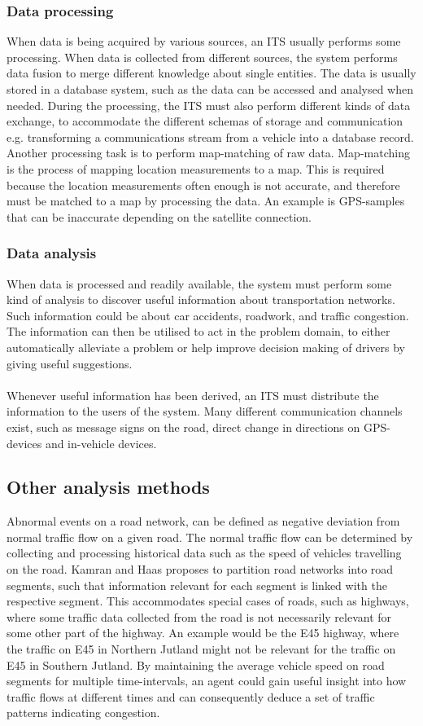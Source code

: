\subsubsection*{Data processing}
When data is being acquired by various sources, an ITS usually performs some processing. When data is collected from different sources, the system performs data fusion to merge different knowledge about single entities. The data is usually stored in a database system, such as the data can be accessed and analysed when needed. During the processing, the ITS must also perform different kinds of data exchange, to accommodate the different schemas of storage and communication e.g. transforming a communications stream from a vehicle into a database record.\\
Another processing task is to perform map-matching of raw data. Map-matching is the process of mapping location measurements to a map. This is required because the location measurements often enough is not accurate, and therefore must be matched to a map by processing the data. An example is GPS-samples that can be inaccurate depending on the satellite connection.

\subsubsection*{Data analysis}
When data is processed and readily available, the system must perform some kind of analysis to discover useful information about transportation networks. Such information could be about car accidents, roadwork, and traffic congestion. The information can then be utilised to act in the problem domain, to either automatically alleviate a problem or help improve decision making of drivers by giving useful suggestions.
\\\\
Whenever useful information has been derived, an ITS must distribute the information to the users of the system. Many different communication channels exist, such as message signs on the road, direct change in directions on GPS-devices and in-vehicle devices.

\subsection{Other analysis methods}
Abnormal events on a road network, can be defined as negative deviation from normal traffic flow on a given road. The normal traffic flow can be determined by collecting and processing historical data such as the speed of vehicles travelling on the road. Kamran and Haas\cite{KamranHaas2007} proposes to partition road networks into road segments, such that information relevant for each segment is linked with the respective segment. This accommodates special cases of roads, such as highways, where some traffic data collected from the road is not necessarily relevant for some other part of the highway. An example would be the E45 highway, where the traffic on E45 in Northern Jutland might not be relevant for the traffic on E45 in Southern Jutland. By maintaining the average vehicle speed on road segments for multiple time-intervals, an agent could gain useful insight into how traffic flows at different times and can consequently deduce a set of traffic patterns indicating congestion.
